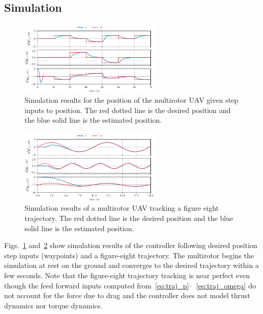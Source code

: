 
\subsection{Simulation}

\begin{figure}
  \centering
  \includegraphics[width=0.6\textwidth]{figures/sim_wps_position}
  \caption[LQR Simulation Results Flying Waypoints]{Simulation results for the position of the multirotor UAV given step
  inputs to position. The red dotted line is the desired position and the blue
solid line is the estimated position.}
  \label{f:sim_wps}
\end{figure}

\begin{figure}
  \centering
  \includegraphics[width=0.6\textwidth]{figures/sim_fig8_position}
  \caption[LQR Simulation Results Flying a Trajectory]{Simulation results of a multirotor UAV tracking a figure eight
  trajectory. The red dotted line is the desired position and the blue solid
line is the estimated position.}
  \label{f:sim_fig8}
\end{figure}

Figs.~\ref{f:sim_wps} and~\ref{f:sim_fig8} show simulation results of the
controller following desired position step inputs (waypoints) and a figure-eight trajectory. The
multirotor begins the simulation at rest on the ground and converges to the
desired trajectory within a few seconds. Note that the figure-eight trajectory
tracking is near perfect even though the feed forward inputs computed
from~\eqref{eq:traj_p}{}--{}~\eqref{eq:traj_omega} do not account for the force due to drag and
the controller does not model thrust dynamics nor torque dynamics.
